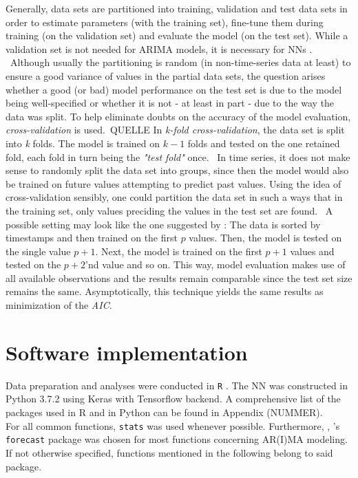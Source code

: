\documentclass[a4paper, 11pt]{article}
\begin{document}
Generally, data sets are partitioned into training, validation and test data sets in order to estimate parameters (with the training set), fine-tune them during training (on the validation set) and evaluate the model (on the test set). While a validation set is not needed for ARIMA models, it is necessary for NNs \citep{Zhou.2006}. \
Although usually the partitioning is random (in non-time-series data at least) to ensure a good variance of values in the partial data sets, the question arises whether a good (or bad) model performance on the test set is due to the model being well-specified or whether it is not - at least in part - due to the way the data was split. To help eliminate doubts on the accuracy of the model evaluation,  \textit{cross-validation} is used.\ QUELLE
In \textit{k-fold cross-validation}, the data set is split into \textit{k} folds. The model is trained on $k-1$ folds and tested on the one retained fold, each fold in turn being the \textit{"test fold"} once. \
In time series, it does not make sense to randomly split the data set into groups, since then the model would also be trained on future values attempting to predict past values. Using the idea of cross-validation sensibly, one could partition the data set in such a ways that in the training set, only values preciding the values in the test set are found. \
A possible setting may look like the one suggested by \cite{Hyndman.2018}: The data is sorted by timestamps and then trained on the first $p$ values. Then, the model is tested on the single value $p+1$. Next, the model is trained on the first $p+1$ values and tested on the $p+2$'nd value and so on. This way, model evaluation makes use of all available observations and the results remain comparable since the test set size remains the same. Asymptotically, this technique yields the same results as minimization of the \textit{AIC}.

\section{Software implementation}

Data preparation and analyses were conducted in \texttt{R} \citep{Team.2013}. The NN was constructed in Python 3.7.2 using Keras \citep{chollet2015keras} with Tensorflow \citep{tensorflow2015-whitepaper} backend. A comprehensive list of the packages used in R and in Python can be found in Appendix (NUMMER).\\

For all common functions, \texttt{stats} was used whenever possible. Furthermore, , \cite{Hyndman.2008}'s  \texttt{forecast} package was chosen for most functions concerning AR(I)MA modeling. If not otherwise specified, functions mentioned in the following belong to said package.
\end{document}
